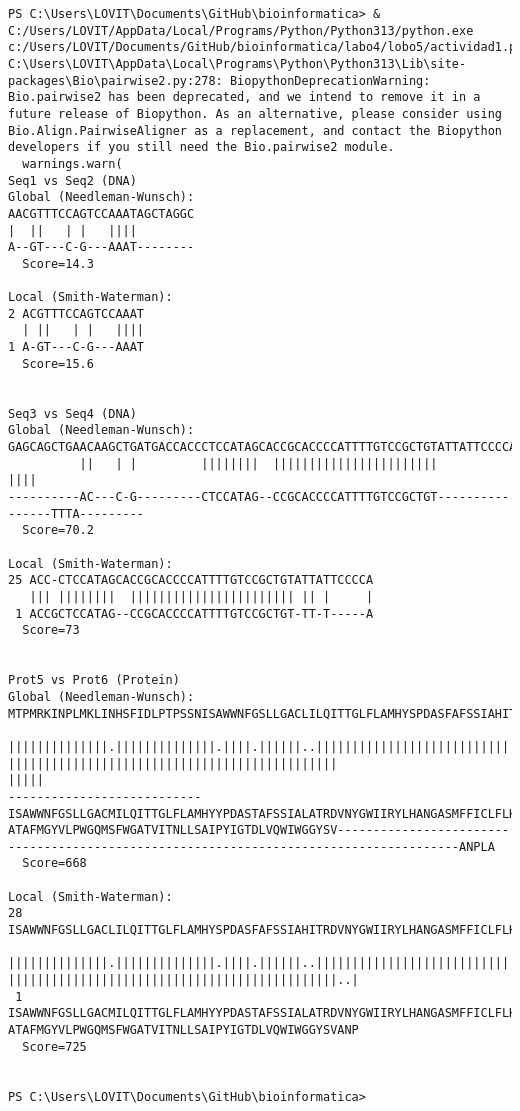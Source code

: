 \documentclass[fleqn,10pt]{article}
\begin{document}
\begin{lstlisting}[style=outputstyle, caption={Salida de la consola al ejecutar el script de Python (ejemplo con globalxx/localxx)}, label={lst:biopython_output}]
PS C:\Users\LOVIT\Documents\GitHub\bioinformatica> & C:/Users/LOVIT/AppData/Local/Programs/Python/Python313/python.exe c:/Users/LOVIT/Documents/GitHub/bioinformatica/labo4/lobo5/actividad1.py
C:\Users\LOVIT\AppData\Local\Programs\Python\Python313\Lib\site-packages\Bio\pairwise2.py:278: BiopythonDeprecationWarning: Bio.pairwise2 has been deprecated, and we intend to remove it in a future release of Biopython. As an alternative, please consider using Bio.Align.PairwiseAligner as a replacement, and contact the Biopython developers if you still need the Bio.pairwise2 module.
  warnings.warn(
Seq1 vs Seq2 (DNA)
Global (Needleman-Wunsch):
AACGTTTCCAGTCCAAATAGCTAGGC
|  ||   | |   ||||        
A--GT---C-G---AAAT--------
  Score=14.3

Local (Smith-Waterman):
2 ACGTTTCCAGTCCAAAT
  | ||   | |   ||||
1 A-GT---C-G---AAAT
  Score=15.6


Seq3 vs Seq4 (DNA)
Global (Needleman-Wunsch):
GAGCAGCTGAACAAGCTGATGACCACCCTCCATAGCACCGCACCCCATTTTGTCCGCTGTATTATTCCCCAATGAGTTTAAGCAATCGG
          ||   | |         ||||||||  |||||||||||||||||||||||                ||||
----------AC---C-G---------CTCCATAG--CCGCACCCCATTTTGTCCGCTGT----------------TTTA---------
  Score=70.2

Local (Smith-Waterman):
25 ACC-CTCCATAGCACCGCACCCCATTTTGTCCGCTGTATTATTCCCCA
   ||| ||||||||  ||||||||||||||||||||||| || |     |
 1 ACCGCTCCATAG--CCGCACCCCATTTTGTCCGCTGT-TT-T-----A
  Score=73


Prot5 vs Prot6 (Protein)
Global (Needleman-Wunsch):
MTPMRKINPLMKLINHSFIDLPTPSSNISAWWNFGSLLGACLILQITTGLFLAMHYSPDASFAFSSIAHITRDVNYGWIIRYLHANGASMFFICLFLHIGRGLYYGSFLYSETNWIGIILLLATMATAFMGYVLPWGQMSFWGATVITNLLSAIPYIGTDLVQWIWGGYSVDSPTLTRFFTFHFILPFIIAALATLHLLFLHETGSNNPLGITSHSDKITFHPYYTIKDALGLLLFLSLMTLTLFSPDLLGDPDNYTLANPLA
                           ||||||||||||||.||||||||||||||.||||.||||||..|||||||||||||||||||||||||||||||||||||||||||||||||....| ||||||||||||||||||||||||||||||||||||||||||||||                                                                                       |||||
---------------------------ISAWWNFGSLLGACMILQITTGLFLAMHYYPDASTAFSSIALATRDVNYGWIIRYLHANGASMFFICLFLHIGRGLYYGSFLYSETNWIGIIFQMST-ATAFMGYVLPWGQMSFWGATVITNLLSAIPYIGTDLVQWIWGGYSV---------------------------------------------------------------------------------------ANPLA
  Score=668

Local (Smith-Waterman):
28 ISAWWNFGSLLGACLILQITTGLFLAMHYSPDASFAFSSIAHITRDVNYGWIIRYLHANGASMFFICLFLHIGRGLYYGSFLYSETNWIGIILLLATMATAFMGYVLPWGQMSFWGATVITNLLSAIPYIGTDLVQWIWGGYSVDSP
   ||||||||||||||.||||||||||||||.||||.||||||..|||||||||||||||||||||||||||||||||||||||||||||||||....| ||||||||||||||||||||||||||||||||||||||||||||||..|
 1 ISAWWNFGSLLGACMILQITTGLFLAMHYYPDASTAFSSIALATRDVNYGWIIRYLHANGASMFFICLFLHIGRGLYYGSFLYSETNWIGIIFQMST-ATAFMGYVLPWGQMSFWGATVITNLLSAIPYIGTDLVQWIWGGYSVANP
  Score=725


PS C:\Users\LOVIT\Documents\GitHub\bioinformatica>  
\end{lstlisting}
\end{document}
